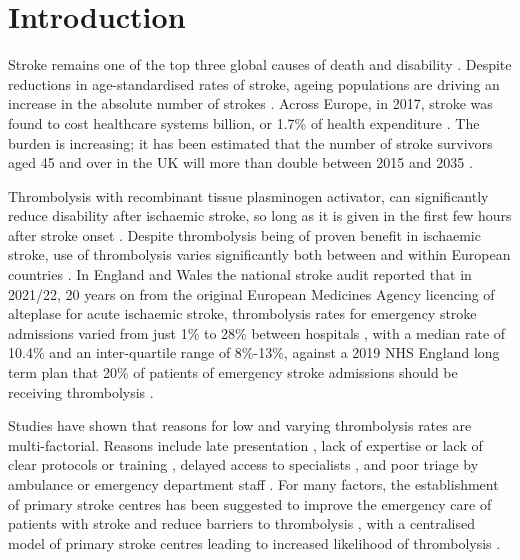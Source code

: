 \section{Introduction}




Stroke remains one of the top three global causes of death and disability \cite{feigin_global_2021}. Despite reductions in age-standardised rates of stroke, ageing populations are driving an increase in the absolute number of strokes \cite{feigin_global_2021}. Across Europe, in 2017, stroke was found to cost healthcare systems  billion, or 1.7\% of health expenditure \cite{luengo-fernandez_economic_2020}. The burden is increasing; it has been estimated that the number of stroke survivors aged 45 and over in the UK will more than double between 2015 and 2035 \cite{king_future_2020}.

Thrombolysis with recombinant tissue plasminogen activator, can significantly reduce disability after ischaemic stroke, so long as it is given in the first few hours after stroke onset \cite{emberson_effect_2014}. Despite thrombolysis being of proven benefit in ischaemic stroke, use of thrombolysis varies significantly both between and within European countries \cite{aguiar_de_sousa_access_2019}. In England and Wales the national stroke audit reported that in 2021/22, 20 years on from the original European Medicines Agency licencing of alteplase for acute ischaemic stroke, thrombolysis rates for emergency stroke admissions varied from just 1\% to 28\% between hospitals \cite{sentinel_national_stroke_audit_programme_ssnap_2022}, with a median rate of 10.4\% and an inter-quartile range of 8\%-13\%, against a 2019 NHS England long term plan that 20\% of patients of emergency stroke admissions should be receiving thrombolysis \cite{nhs_long_term_plan_2019}.


Studies have shown that reasons for low and varying thrombolysis rates are multi-factorial. Reasons include late presentation \cite{aguiar_de_sousa_access_2019}, lack of expertise \cite{aguiar_de_sousa_access_2019} or lack of clear protocols or training \cite{carter-jones_stroke_2011}, delayed access to specialists \cite{kamal_delays_2017}, and poor triage by ambulance or emergency department staff \cite{carter-jones_stroke_2011}. For many factors, the establishment of primary stroke centres has been suggested to improve the emergency care of patients with stroke and reduce barriers to thrombolysis \cite{carter-jones_stroke_2011}, with a centralised model of primary stroke centres leading to increased likelihood of thrombolysis \cite{lahr_proportion_2012, morris_impact_2014, hunter_impact_2013}. 


